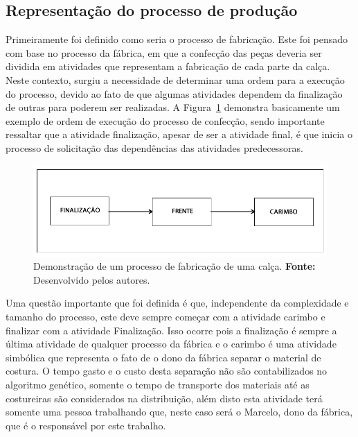 \subsection{Representação do processo de produção}

\par Primeiramente foi definido como seria o processo de fabricação. Este foi pensado com base no 
processo da fábrica, em que a confecção das peças deveria ser dividida em atividades que representam a fabricação de
cada parte da calça. Neste contexto, surgiu a necessidade de determinar uma ordem para a execução do processo, 
devido ao fato de que algumas atividades dependem da finalização de outras para poderem ser
realizadas. A Figura~\ref{fig:processo_fabricacao} demonstra basicamente um
exemplo de ordem de execução do processo de confecção, sendo importante ressaltar que a atividade finalização, apesar
de ser a atividade final, é que inicia o processo de solicitação das dependências das atividades predecessoras.


\begin{figure}[h!]
	\centerline{\includegraphics[scale=0.5]{./imagens/processo1.png}}
	\caption[Demonstração de um processo de fabricação de uma calça.]
	{Demonstração de um processo de fabricação de uma calça. \textbf{Fonte:}
	Desenvolvido pelos autores.}
	\label{fig:processo_fabricacao}
\end{figure}

\par  Uma questão importante que foi definida é que, independente da complexidade e tamanho do processo, este deve sempre começar 
com a atividade carimbo e finalizar com a atividade Finalização. Isso ocorre pois a finalização é sempre a última atividade 
de qualquer processo da fábrica e o carimbo é uma atividade simbólica que representa o fato de o dono da fábrica separar o 
material de costura. O tempo gasto e o custo desta separação não são contabilizados no algoritmo genético, somente o tempo de 
transporte dos materiais até as costureiras são considerados na distribuição, além disto esta atividade terá somente uma pessoa
trabalhando que, neste caso será o Marcelo, dono da fábrica, que é o responsável por este trabalho.

